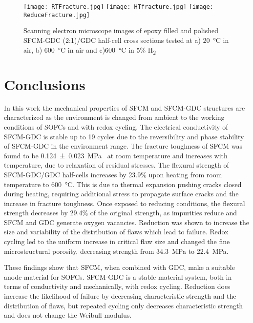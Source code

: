         \begin{figure}
          \texttt{[image: RTFracture.jpg]}
          \texttt{[image: HTfracture.jpg]}
          \texttt{[image: ReduceFracture.jpg]}
          \caption{Scanning electron microscope images of epoxy filled and polished SFCM-GDC (2:1)/GDC half-cell cross sections tested at a) \SI{20}{\celsius} in air, b) \SI{600}{\celsius} in air and c)\SI{600}{\celsius} in 5\% H\textsubscript{2}}
          \label{fig:InSituSEM}
        \end{figure}

\section{Conclusions}
    In this work the mechanical properties of SFCM and SFCM-GDC structures are characterized as the environment is changed from ambient to the working conditions of SOFCs and with redox cycling.
    The electrical conductivity of SFCM-GDC is stable up to 19 cycles due to the reversibility and phase stability of SFCM-GDC in the environment range.
    The fracture toughness of SFCM was found to be \SI[separate-uncertainty = true]{0.124 +- 0.023}{\mega\pascal{}} at room temperature and increases with temperature, due to relaxation of residual stresses.
    The flexural strength of SFCM-GDC/GDC half-cells increases by 23.9\% upon heating from room temperature to \SI{600}{\celsius}.
    This is due to thermal expansion pushing cracks closed during heating, requiring additional stress to propagate surface cracks and the increase in fracture toughness.
    Once exposed to reducing conditions, the flexural strength decreases by 29.4\% of the original strength, as impurities reduce and SFCM and GDC generate oxygen vacancies.
    Reduction was shown to increase the size and variability of the distribution of flaws which lead to failure.
    Redox cycling led to the uniform increase in critical flaw size and changed the fine microstructural porosity, decreasing strength from \SI{34.3}{\mega\pascal} to \SI{22.4}{\mega\pascal}.

    These findings show that SFCM, when combined with GDC, make a suitable anode material for SOFCs.
    SFCM-GDC is a stable material system, both in terms of conductivity and mechanically, with redox cycling.
    Reduction does increase the likelihood of failure by decreasing characteristic strength and the distribution of flaws, but repeated cycling only decreases characteristic strength and does not change the Weibull modulus.
